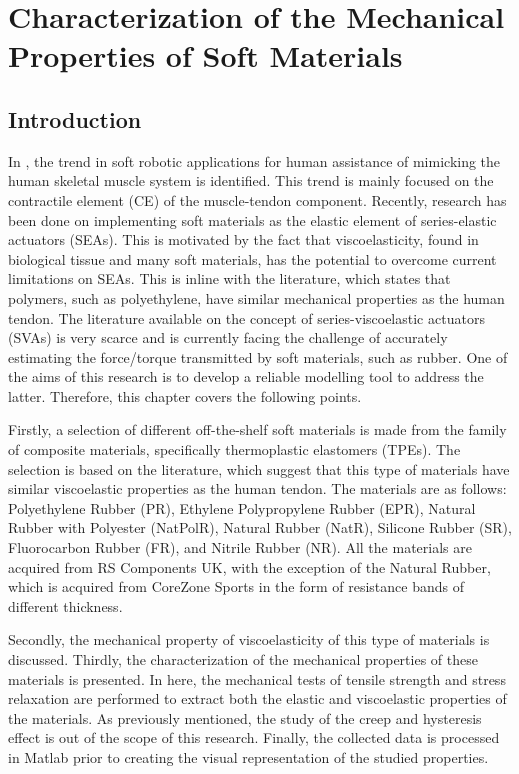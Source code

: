 \chapter{Characterization of the Mechanical Properties of Soft Materials} \label{ch:characterizationSoft}

\section{Introduction}

In , the trend in soft robotic applications for human assistance of mimicking the human skeletal muscle system is identified. This trend is mainly focused on the contractile element (CE) of the muscle-tendon component. Recently, research has been done on implementing soft materials as the elastic element of series-elastic actuators (SEAs). This is motivated by the fact that viscoelasticity, found in biological tissue and many soft materials, has the potential to overcome current limitations on SEAs. This is inline with the literature, which states that polymers, such as polyethylene, have similar mechanical properties as the human tendon. The literature available on the concept of series-viscoelastic actuators (SVAs) is very scarce and is currently facing the challenge of accurately estimating the force/torque transmitted by soft materials, such as rubber. One of the aims of this research is to develop a reliable modelling tool to address the latter. Therefore, this chapter covers the following points.

Firstly, a selection of different off-the-shelf soft materials is made from the family of composite materials, specifically thermoplastic elastomers (TPEs). The selection is based on the literature, which suggest that this type of materials have similar viscoelastic properties as the human tendon. The materials are as follows: Polyethylene Rubber (PR), Ethylene Polypropylene Rubber (EPR), Natural Rubber with Polyester (NatPolR), Natural Rubber (NatR), Silicone Rubber (SR), Fluorocarbon Rubber (FR), and Nitrile Rubber (NR). All the materials are acquired from RS Components UK\textregistered{}, with the exception of the Natural Rubber, which is acquired from CoreZone Sports\textregistered{} in the form of resistance bands of different thickness.

Secondly, the mechanical property of viscoelasticity of this type of materials is discussed. Thirdly, the characterization of the mechanical properties of these materials is presented. In here, the mechanical tests of tensile strength and stress relaxation are performed to extract both the elastic and viscoelastic properties of the materials. As previously mentioned, the study of the creep and hysteresis effect is out of the scope of this research. Finally, the collected data is processed in Matlab\textregistered{} prior to creating the visual representation of the studied properties. 

